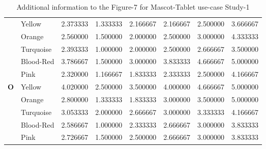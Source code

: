 \begin{table}[H]
\begin{center}
\begin{tabular}{ |p{0.5cm}| p{2cm}|p{1.5cm}|p{1.5cm}| p{1.5cm}|p{1.5cm}|p{1.5cm}| p{1.5cm}| }
&    Yellow & 2.373333 & 1.333333 &2.166667 &2.166667 &2.500000 &3.666667\\
&    Orange & 2.560000 & 1.500000 &2.000000 &2.500000 &3.000000 &4.333333\\
& Turquoise & 2.393333 & 1.000000 &2.000000 &2.500000 &2.666667 &3.500000\\
& Blood-Red & 3.786667 & 1.500000 &3.000000 &3.833333 &4.666667 &5.000000\\
&      Pink & 2.320000 & 1.166667 &1.833333 &2.333333 &2.500000 &4.166667\\
 \hline 
 \hline 
 \multirow{5}{*}{\textbf{O}} 
&    Yellow & 4.020000 & 2.500000 &3.500000 &4.000000 &4.666667 &5.000000\\
&    Orange & 2.800000 & 1.333333 &1.833333 &3.000000 &3.500000 &5.000000\\
& Turquoise & 3.053333 & 2.000000 &2.666667 &3.000000& 3.333333 &4.166667\\
& Blood-Red & 2.586667 & 1.000000 &2.333333 &2.666667 &3.000000 &3.833333\\
&      Pink & 2.726667 & 1.500000 &2.500000& 2.666667 &3.000000 &3.833333\\
 \hline 
\end{tabular}
\end{center}
\caption{Additional information to the Figure-7 for Mascot-Tablet use-case Study-1}
\end{table}

